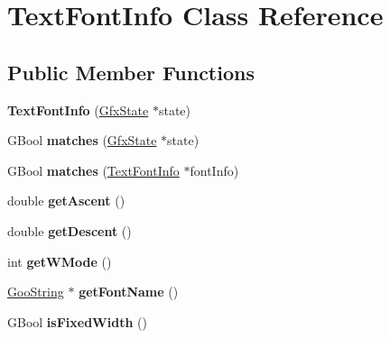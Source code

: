 \hypertarget{class_text_font_info}{}\section{Text\+Font\+Info Class Reference}
\label{class_text_font_info}
\subsection*{Public Member Functions}
\begin{DoxyCompactItemize}
\item 
\mbox{\label{class_text_font_info_a03731feb5024b1185102a172b8f9bd8e}} 
{\bfseries Text\+Font\+Info} (\hyperlink{class_gfx_state}{Gfx\+State} $\ast$state)
\item 
\mbox{\label{class_text_font_info_a045d1bdc7ad1e8df2cad84ea8e8b93ca}} 
G\+Bool {\bfseries matches} (\hyperlink{class_gfx_state}{Gfx\+State} $\ast$state)
\item 
\mbox{\label{class_text_font_info_a8dc9f8e2eeb8bd1baebe99cec6951a43}} 
G\+Bool {\bfseries matches} (\hyperlink{class_text_font_info}{Text\+Font\+Info} $\ast$font\+Info)
\item 
\mbox{\label{class_text_font_info_ace6f8a08f2a80984e6cf34ebb28c81c3}} 
double {\bfseries get\+Ascent} ()
\item 
\mbox{\label{class_text_font_info_a8157c170b4569b6f2c954c008d830a0b}} 
double {\bfseries get\+Descent} ()
\item 
\mbox{\label{class_text_font_info_a15572217d5b0e5a8a75ec9f85796a651}} 
int {\bfseries get\+W\+Mode} ()
\item 
\mbox{\label{class_text_font_info_a7511c481d89e7d767e8d89ad30e004df}} 
\hyperlink{class_goo_string}{Goo\+String} $\ast$ {\bfseries get\+Font\+Name} ()
\item 
\mbox{\label{class_text_font_info_a9dbd2a5da83a16f01d53aeaa09a8c548}} 
G\+Bool {\bfseries is\+Fixed\+Width} ()
\item 
\mbox{\label{class_text_font_info_ab018c829dc46ac2815b8c1da86318c76}} 

\end{DoxyCompactItemize}
